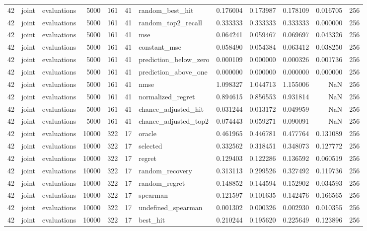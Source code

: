 \begin{tabular}{rllrrrlrrrrr}
42 & joint & evaluations & 5000 & 161 & 41 & random_best_hit & 0.176004 & 0.173987 & 0.178109 & 0.016705 & 256 \\
42 & joint & evaluations & 5000 & 161 & 41 & random_top2_recall & 0.333333 & 0.333333 & 0.333333 & 0.000000 & 256 \\
42 & joint & evaluations & 5000 & 161 & 41 & mse & 0.064241 & 0.059467 & 0.069697 & 0.043326 & 256 \\
42 & joint & evaluations & 5000 & 161 & 41 & constant_mse & 0.058490 & 0.054384 & 0.063412 & 0.038250 & 256 \\
42 & joint & evaluations & 5000 & 161 & 41 & prediction_below_zero & 0.000109 & 0.000000 & 0.000326 & 0.001736 & 256 \\
42 & joint & evaluations & 5000 & 161 & 41 & prediction_above_one & 0.000000 & 0.000000 & 0.000000 & 0.000000 & 256 \\
42 & joint & evaluations & 5000 & 161 & 41 & nmse & 1.098327 & 1.044713 & 1.155006 & NaN & 256 \\
42 & joint & evaluations & 5000 & 161 & 41 & normalized_regret & 0.894615 & 0.856553 & 0.931814 & NaN & 256 \\
42 & joint & evaluations & 5000 & 161 & 41 & chance_adjusted_hit & 0.031244 & 0.013172 & 0.049959 & NaN & 256 \\
42 & joint & evaluations & 5000 & 161 & 41 & chance_adjusted_top2 & 0.074443 & 0.059271 & 0.090091 & NaN & 256 \\
42 & joint & evaluations & 10000 & 322 & 17 & oracle & 0.461965 & 0.446781 & 0.477764 & 0.131089 & 256 \\
42 & joint & evaluations & 10000 & 322 & 17 & selected & 0.332562 & 0.318451 & 0.348073 & 0.127772 & 256 \\
42 & joint & evaluations & 10000 & 322 & 17 & regret & 0.129403 & 0.122286 & 0.136592 & 0.060519 & 256 \\
42 & joint & evaluations & 10000 & 322 & 17 & random_recovery & 0.313113 & 0.299526 & 0.327492 & 0.119736 & 256 \\
42 & joint & evaluations & 10000 & 322 & 17 & random_regret & 0.148852 & 0.144594 & 0.152902 & 0.034593 & 256 \\
42 & joint & evaluations & 10000 & 322 & 17 & spearman & 0.121597 & 0.101635 & 0.142476 & 0.166565 & 256 \\
42 & joint & evaluations & 10000 & 322 & 17 & undefined_spearman & 0.001302 & 0.000326 & 0.002930 & 0.010355 & 256 \\
42 & joint & evaluations & 10000 & 322 & 17 & best_hit & 0.210244 & 0.195620 & 0.225649 & 0.123896 & 256 \\

\end{tabular}
